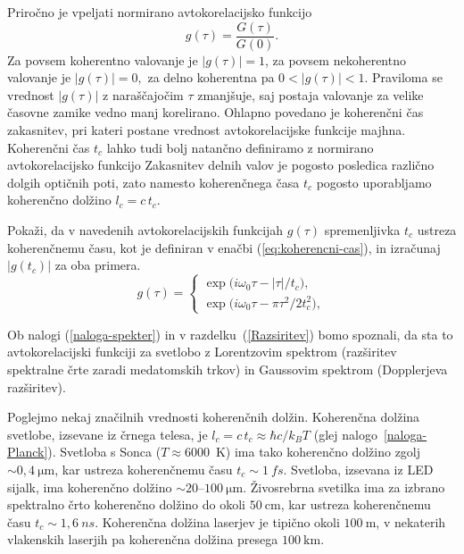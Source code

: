 Priročno je vpeljati normirano avtokorelacijsko funkcijo 
\begin{equation}
g(\tau)=\frac{G(\tau)}{G(0)}.
\label{eq:avtokorelacija-norm}
\end{equation}
Za povsem koherentno valovanje je $|g(\tau)|=1$, za povsem nekoherentno
valovanje je $|g(\tau)|=0,$ za delno koherentna  pa $0<|g(\tau)|<1$.
Praviloma se vrednost $|g(\tau)|$ z naraščajočim $\tau$ zmanjšuje,
saj postaja valovanje za velike časovne zamike vedno manj korelirano.
Ohlapno povedano je koherenčni čas zakasnitev, pri kateri postane
vrednost avtokorelacijske funkcije majhna.
Koherenčni čas $t_{c}$ lahko tudi bolj natančno definiramo 
z normirano avtokorelacijsko funkcijo
Zakasnitev delnih valov je pogosto posledica
različno dolgih optičnih poti, zato namesto koherenčnega časa $t_c$
pogosto uporabljamo koherenčno dolžino $l_{c}=c\,t_{c}$. 

\begin{definition}
Pokaži, da v navedenih avtokorelacijskih
funkcijah $g(\tau)$ spremenljivka $t_{c}$ ustreza koherenčnemu času,
kot je definiran v enačbi (\ref{eq:koherencni-cas}), in izračunaj $|g(t_{c})|$ za oba primera.
\begin{equation}
g(\tau)=\begin{cases}
\exp\big(i\omega_{0}\tau-\left|\tau\right|/t_{c}\big),\\
\exp\big(i\omega_{0}\tau-\pi\tau^{2}/2t_{c}^{2}\big),
\end{cases}
\label{eq:gauss-eksponent}
\end{equation}

Ob nalogi (\ref{naloga-spekter}) in v razdelku~(\ref{Razsiritev}) 
bomo spoznali, da sta to avtokorelacijski
funkciji za svetlobo z Lorentzovim spektrom
(razširitev spektralne črte zaradi medatomskih trkov) in Gaussovim spektrom
(Dopplerjeva razširitev).
\end{definition}

Poglejmo nekaj značilnih vrednosti koherenčnih dolžin. 
Koherenčna dolžina svetlobe, izsevane iz črnega telesa, je $l_{c}=c\,t_{c}\approx 
\hbar c/k_{B}T$ (glej nalogo~\ref{naloga-Planck}). 
Svetloba s Sonca ($T \approx 6000$~K)
ima tako koherenčno dolžino zgolj $\sim 0,4~\si{\micro\metre}$, kar ustreza
koherenčnemu času $t_c \sim 1~\si{fs}$. Svetloba,
izsevana iz LED sijalk, ima koherenčno dolžino $\sim20$--$100~\si{\micro\metre}$.
Živosrebrna svetilka ima za izbrano spektralno črto koherenčno dolžino
do okoli $50~\si{\centi\metre}$, kar ustreza koherenčnemu času $t_c \sim 1,6~\si{ns}$.
Koherenčna dolžina laserjev je tipično okoli $100~\si{\metre}$, 
v nekaterih vlakenskih laserjih pa koherenčna dolžina 
presega $100~\si{\kilo\metre}$.

